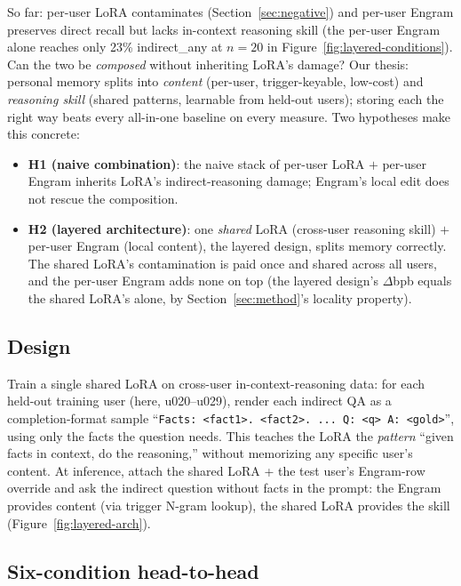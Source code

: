 \documentclass[11pt]{article}
\begin{document}
So far: per-user LoRA contaminates (Section~\ref{sec:negative})
and per-user Engram preserves direct recall but lacks in-context
reasoning skill (the per-user Engram alone reaches only 23\%
indirect\_any at $n{=}20$ in
Figure~\ref{fig:layered-conditions}). Can the two be \emph{composed}
without inheriting LoRA's damage? Our thesis: personal memory
splits into \emph{content} (per-user, trigger-keyable,
low-cost) and \emph{reasoning skill} (shared patterns,
learnable from held-out users); storing each the right way beats
every all-in-one baseline on every measure. Two
hypotheses make this concrete:
\begin{itemize}[leftmargin=*,topsep=2pt,itemsep=1pt]
  \item \textbf{H1 (naive combination)}: the naive stack of
        per-user LoRA $+$ per-user Engram inherits
        LoRA's indirect-reasoning damage; Engram's local edit does
        not rescue the composition.
  \item \textbf{H2 (layered architecture)}: one \emph{shared}
        LoRA (cross-user reasoning skill) $+$ per-user Engram (local
        content), the layered design, splits memory correctly. The
        shared LoRA's contamination is paid once and shared across
        all users, and the per-user Engram adds none on top (the
        layered design's $\Delta$bpb equals the shared LoRA's alone,
        by Section~\ref{sec:method}'s locality property).
\end{itemize}


\subsection{Design}

Train a single shared LoRA on cross-user in-context-reasoning data:
for each held-out training user (here, u020–u029), render each
indirect QA as a completion-format sample
``\texttt{Facts: <fact1>. <fact2>. ... Q: <q> A: <gold>}'', using only
the facts the question needs. This teaches the LoRA the
\emph{pattern} ``given facts in context, do the reasoning,'' without
memorizing any specific user's content. At inference, attach the
shared LoRA + the test user's Engram-row override and ask the indirect
question without facts in the prompt: the Engram provides content (via
trigger N-gram lookup), the shared LoRA provides the skill
(Figure~\ref{fig:layered-arch}).

\subsection{Six-condition head-to-head}
\end{document}
